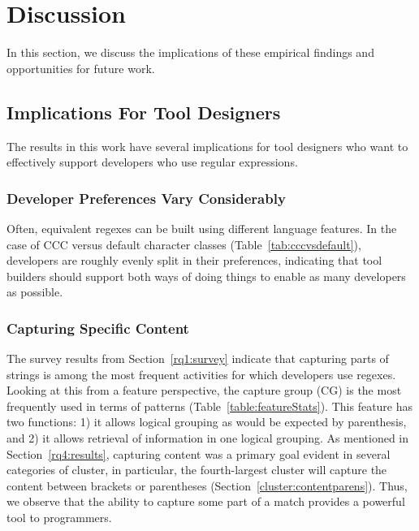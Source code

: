 \section{Discussion}
\label{sec:discussion}

In this section, we discuss the implications of these empirical findings 
 and opportunities for future work.

\subsection{Implications For Tool Designers}
The results in this work have several implications for tool designers who want to effectively support developers who use regular expressions.

\subsubsection{Developer Preferences Vary Considerably}
Often, equivalent regexes can be built using different language features. In the case of CCC versus default character classes (Table~\ref{tab:cccvsdefault}), developers are roughly evenly split in their preferences, indicating that tool builders should support both ways of doing things to enable as many developers as possible. 

\subsubsection{Capturing Specific Content}
The survey results from Section~\ref{rq1:survey} indicate that capturing parts of strings is among the most frequent activities for which developers use regexes.
Looking at this from a feature perspective, the capture group (CG) is the most frequently used in terms of patterns (Table~\ref{table:featureStats}).  This feature has two functions: 1) it allows logical grouping as would be expected by parenthesis, and 2) it allows retrieval of information in one logical grouping.  As mentioned in Section~\ref{rq4:results}, capturing content was a primary goal evident in several categories of cluster, in particular, the fourth-largest cluster will capture the content between brackets or parentheses (Section~\ref{cluster:contentparens}).  Thus, we observe that the ability to capture some part of a match provides a powerful tool to programmers. 

